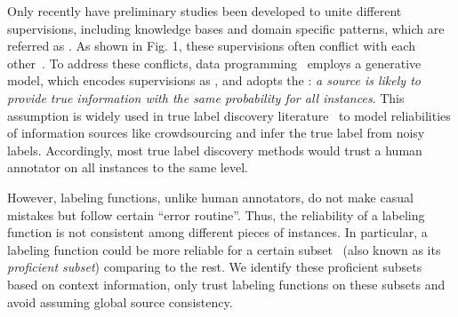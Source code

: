 Only recently have preliminary studies been developed to unite different supervisions, including knowledge bases and domain specific patterns, which are referred as \hs.
As shown in Fig. 1, these supervisions often conflict with each other~\cite{ratner2016data}.
To address these conflicts, data programming~\cite{ratner2016data} employs a generative model, which encodes supervisions as \lf, and adopts the \sca: \emph{a source is likely to provide true information with the same probability for all instances}.
This assumption is widely used in true label discovery literature~\cite{Li:2016:STD:2897350.2897352} to model reliabilities of information sources like crowdsourcing and infer the true label from noisy labels. Accordingly, most true label discovery methods would trust a human annotator on all instances to the same level.

However, labeling functions, unlike human annotators, do not make casual mistakes but follow certain ``error routine''. 
Thus, the reliability of a labeling function is not consistent among different pieces of instances.
In particular, a labeling function could be more reliable for a certain subset~\cite{varma2016socratic} (also known as its \emph{proficient subset}) comparing to the rest. 
We identify these proficient subsets based on context information, only trust labeling functions on these subsets and avoid assuming global source consistency.

